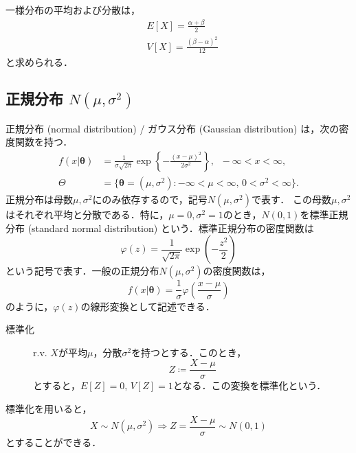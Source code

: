\documentclass{jsreport}
\begin{document}
一様分布の平均および分散は，
\begin{align}
  &E[X] = \frac{\alpha + \beta}{2} \nonumber \\
  &V[X] = \frac{(\beta - \alpha)^2}{12} \nonumber
\end{align}
と求められる．

\subsection{正規分布 $N(\mu, \sigma^2)$}
正規分布 (normal distribution) / ガウス分布 (Gaussian distribution) は，次の密度関数を持つ．
\begin{align}
  f(x | \bm{\theta}) &= \frac{1}{\sigma \sqrt{2\pi}} \exp\left\{- \frac{(x - \mu)^2}{2 \sigma^2} \right\}, \; \; -\infty < x < \infty, \nonumber \\
  \Theta &= \{\bm{\theta} = (\mu, \sigma^2) : -\infty < \mu < \infty, \, 0 < \sigma^2 < \infty\}. \nonumber
\end{align}
正規分布は母数$\mu, \sigma^2$にのみ依存するので，記号$N(\mu, \sigma^2)$で表す．
この母数$\mu, \sigma^2$はそれぞれ平均と分散である．特に，$\mu = 0, \sigma^2 = 1$のとき，$N(0,1)$を標準正規分布 (standard normal distribution) という．標準正規分布の密度関数は
\begin{equation}
  \varphi(z) = \frac{1}{\sqrt{2\pi}} \exp\left(- \frac{z^2}{2}\right) \nonumber
\end{equation}
という記号で表す．一般の正規分布$N(\mu, \sigma^2)$の密度関数は，
\begin{equation}
  f(x | \bm{\theta}) = \frac{1}{\sigma} \varphi\left(\frac{x - \mu}{\sigma}\right) \nonumber
\end{equation}
のように，$\varphi(z)$の線形変換として記述できる．

\begin{description}
  \item[標準化]
  r.v. $X$が平均$\mu$，分散$\sigma^2$を持つとする．このとき，
  \begin{equation}
    Z \coloneqq \frac{X - \mu}{\sigma} \nonumber
  \end{equation}
  とすると，$E[Z] = 0, \, V[Z] = 1$となる．この変換を標準化という．
\end{description}

標準化を用いると，
\begin{equation}
  X \sim N(\mu, \sigma^2) \Longrightarrow Z = \frac{X - \mu}{\sigma} \sim N(0, 1) \nonumber
\end{equation}
とすることができる．
\end{document}
